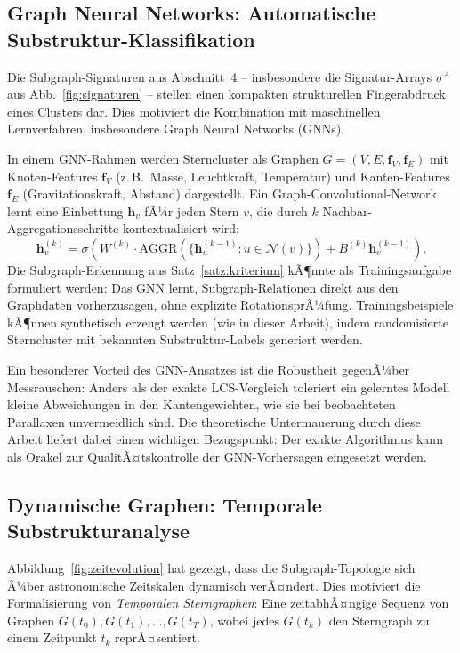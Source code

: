 ﻿\documentclass[a4paper,12pt]{report}
\theoremstyle{definition}
\begin{document}
\subsection{Graph Neural Networks: Automatische Substruktur-Klas\-si\-fikation}

Die Subgraph-Signaturen aus Abschnitt~4 -- insbesondere die Signatur-Arrays $\sigma^A$ aus Abb.~\ref{fig:signaturen} -- stellen einen kompakten strukturellen Fingerabdruck eines Clusters dar. Dies motiviert die Kombination mit maschinellen Lernverfahren, insbesondere Graph Neural Networks (GNNs).

In einem GNN-Rahmen werden Sterncluster als Graphen $G = (V, E, \mathbf{f}_V, \mathbf{f}_E)$ mit Knoten-Features $\mathbf{f}_V$ (z.\,B.\ Masse, Leuchtkraft, Temperatur) und Kanten-Features $\mathbf{f}_E$ (Gravitationskraft, Abstand) dargestellt. Ein Graph-Convolutional-Network lernt eine Einbettung $\mathbf{h}_v$ fÃ¼r jeden Stern $v$, die durch $k$ Nachbar-Aggregationsschritte kontextualisiert wird:
\[
\mathbf{h}_v^{(k)} = \sigma\!\left(W^{(k)} \cdot \mathrm{AGGR}\!\left(\{\mathbf{h}_u^{(k-1)} : u \in \mathcal{N}(v)\}\right) + B^{(k)} \mathbf{h}_v^{(k-1)}\right).
\]
Die Subgraph-Erkennung aus Satz~\ref{satz:kriterium} kÃ¶nnte als Trainingsaufgabe formuliert werden: Das GNN lernt, Subgraph-Relationen direkt aus den Graphdaten vorherzusagen, ohne explizite RotationsprÃ¼fung. Trainingsbeispiele kÃ¶nnen synthetisch erzeugt werden (wie in dieser Arbeit), indem randomisierte Sterncluster mit bekannten Substruktur-Labels generiert werden.

Ein besonderer Vorteil des GNN-Ansatzes ist die Robustheit gegenÃ¼ber Messrauschen: Anders als der exakte LCS-Vergleich toleriert ein gelerntes Modell kleine Abweichungen in den Kantengewichten, wie sie bei beobachteten Parallaxen unvermeidlich sind. Die theoretische Untermauerung durch diese Arbeit liefert dabei einen wichtigen Bezugspunkt: Der exakte Algorithmus kann als Orakel zur QualitÃ¤tskontrolle der GNN-Vorhersagen eingesetzt werden.

\subsection{Dynamische Graphen: Temporale Substrukturanalyse}

Abbildung~\ref{fig:zeitevolution} hat gezeigt, dass die Subgraph-Topologie sich Ã¼ber astronomische Zeitskalen dynamisch verÃ¤ndert. Dies motiviert die Formalisierung von \emph{Temporalen Sterngraphen}: Eine zeitabhÃ¤ngige Sequenz von Graphen $G(t_0), G(t_1), \ldots, G(t_T)$, wobei jedes $G(t_k)$ den Sterngraph zu einem Zeitpunkt $t_k$ reprÃ¤sentiert.
\end{document}
